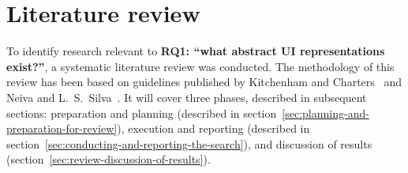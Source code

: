 \chapter{Literature review}\label{ch:literature-review}

To identify research relevant to \textbf{RQ1: \enquote{what abstract UI representations exist?}}, a systematic literature review was conducted.
The methodology of this review has been based on guidelines published by Kitchenham and Charters~\cite{kitchenham_guidelines_2007} and Neiva and L.~S.~Silva~\cite{neiva_systematic_2016}.
It will cover three phases, described in subsequent sections: preparation and planning (described in section~\ref{sec:planning-and-preparation-for-review}), execution and reporting (described in section~\ref{sec:conducting-and-reporting-the-search}), and discussion of results (section~\ref{sec:review-discussion-of-results}).






